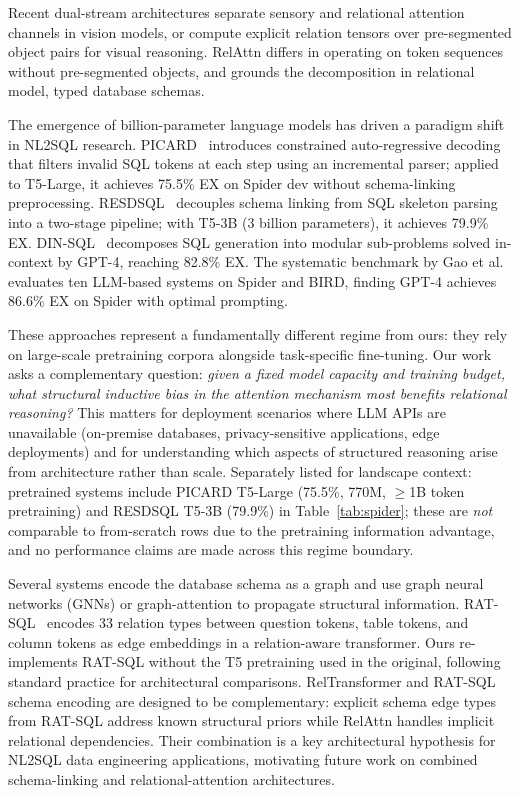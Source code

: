 \documentclass[review]{elsarticle}
\begin{document}
Recent dual-stream architectures separate sensory and relational attention channels in vision models, or compute explicit relation tensors over pre-segmented object pairs for visual reasoning. RelAttn differs in operating on token sequences without pre-segmented objects, and grounds the decomposition in relational model, typed database schemas.

The emergence of billion-parameter language models has driven a paradigm shift in NL2SQL research. PICARD~\cite{scholak2021picard} introduces constrained auto-regressive decoding that filters invalid SQL tokens at each step using an incremental parser; applied to T5-Large, it achieves 75.5\% EX on Spider dev without schema-linking preprocessing. RESDSQL~\cite{li2023resdsql} decouples schema linking from SQL skeleton parsing into a two-stage pipeline; with T5-3B (3 billion parameters), it achieves 79.9\% EX. DIN-SQL~\cite{pourreza2023dinsql} decomposes SQL generation into modular sub-problems solved in-context by GPT-4, reaching 82.8\% EX. The systematic benchmark by Gao et al.~\cite{gao2024daisql} evaluates ten LLM-based systems on Spider and BIRD, finding GPT-4 achieves 86.6\% EX on Spider with optimal prompting.

These approaches represent a fundamentally different regime from ours: they rely on large-scale pretraining corpora alongside task-specific fine-tuning. Our work asks a complementary question: \emph{given a fixed model capacity and training budget, what structural inductive bias in the attention mechanism most benefits relational reasoning?} This matters for deployment scenarios where LLM APIs are unavailable (on-premise databases, privacy-sensitive applications, edge deployments) and for understanding which aspects of structured reasoning arise from architecture rather than scale. Separately listed for landscape context: pretrained systems include PICARD T5-Large (75.5\%, 770M, $\geq$1B token pretraining) and RESDSQL T5-3B (79.9\%) in Table~\ref{tab:spider}; these are \emph{not} comparable to from-scratch rows due to the pretraining information advantage, and no performance claims are made across this regime boundary.

Several systems encode the database schema as a graph and use graph neural networks (GNNs) or graph-attention to propagate structural information. RAT-SQL~\cite{wang2020ratsql} encodes 33 relation types between question tokens, table tokens, and column tokens as edge embeddings in a relation-aware transformer. Ours re-implements RAT-SQL without the T5 pretraining used in the original, following standard practice for architectural comparisons. RelTransformer and RAT-SQL schema encoding are designed to be complementary: explicit schema edge types from RAT-SQL address known structural priors while RelAttn handles implicit relational dependencies. Their combination is a key architectural hypothesis for NL2SQL data engineering applications, motivating future work on combined schema-linking and relational-attention architectures.
\end{document}

